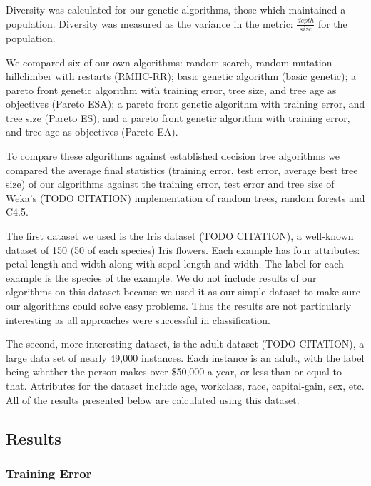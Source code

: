 \documentclass{acm_proc_article-sp}
\begin{document}
Diversity was calculated for our genetic algorithms, those which maintained a population. Diversity was measured as the variance in the metric: $\frac{depth}{size}$ for the population.

We compared six of our own algorithms: random search, random mutation hillclimber with restarts (RMHC-RR); basic genetic algorithm (basic genetic); a pareto front genetic algorithm with training error, tree size, and tree age as objectives (Pareto ESA); a pareto front genetic algorithm with training error, and tree size (Pareto ES); and a pareto front genetic algorithm with training error, and tree age as objectives (Pareto EA).

To compare these algorithms against established decision tree algorithms we compared the average final statistics (training error, test error, average best tree size) of our algorithms against the training error, test error and tree size of Weka's (TODO CITATION) implementation of random trees, random forests and C4.5.

The first dataset we used is the Iris dataset (TODO CITATION), a well-known dataset of 150 (50 of each species) Iris flowers. Each example has four attributes: petal length and width along with sepal length and width. The label for each example is the species of the example. We do not include results of our algorithms on this dataset because we used it as our simple dataset to make sure our algorithms could solve easy problems. Thus the results are not particularly interesting as all approaches were successful in classification.

The second, more interesting dataset, is the adult dataset (TODO CITATION), a large data set of nearly 49,000 instances. Each instance is an adult, with the label being whether the person makes over \$50,000 a year, or less than or equal to that. Attributes for the dataset include age, workclass, race, capital-gain, sex, etc. All of the results presented below are calculated using this dataset.

\subsection{Results}

\subsubsection{Training Error}
\end{document}
